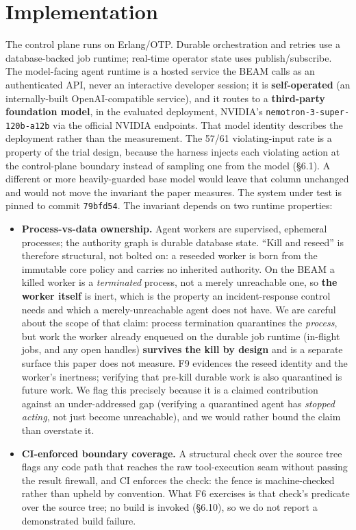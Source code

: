 \documentclass[11pt]{article}
\providecommand{\tightlist}{%
 \setlength{\itemsep}{0pt}\setlength{\parskip}{0pt}}
\begin{document}
\section{Implementation}\label{implementation}

The control plane runs on Erlang/OTP. Durable orchestration and retries use a
database-backed job runtime; real-time operator state uses publish/subscribe. The
model-facing agent runtime is a hosted service the BEAM calls as an authenticated API, never
an interactive developer session; it is \textbf{self-operated} (an internally-built OpenAI-compatible
service), and it routes to a \textbf{third-party foundation model}, in the evaluated deployment,
NVIDIA's \texttt{nemotron-3-super-120b-a12b} via the official NVIDIA endpoints. That model identity
describes the deployment rather than the measurement. The 57/61 violating-input rate is a property
of the trial design, because the harness injects each violating action at the control-plane boundary
instead of sampling one from the model (\S6.1). A different or more heavily-guarded base model would
leave that column unchanged and would not move the invariant the paper measures. The system
under test is pinned to commit \texttt{79bfd54}. The invariant depends on two runtime properties:

\begin{itemize}
\tightlist
\item
 \textbf{Process-vs-data ownership.} Agent workers are supervised, ephemeral processes; the
 authority graph is durable database state. ``Kill and reseed'' is therefore structural, not
 bolted on: a reseeded worker is born from the immutable core policy and carries no
 inherited authority. On the BEAM a killed worker is a \emph{terminated} process, not a merely
 unreachable one, so \textbf{the worker itself} is inert, which is the property an
 incident-response control needs and which a merely-unreachable agent does not have. We are
 careful about the scope of that claim: process termination quarantines the \emph{process}, but
 work the worker already enqueued on the durable job runtime (in-flight jobs, and any open
 handles) \textbf{survives the kill by design} and is a separate surface this paper does not
 measure. F9 evidences the reseed identity and the worker's inertness; verifying that
 pre-kill durable work is also quarantined is future work. We flag this precisely because it
 is a claimed contribution against an under-addressed gap (verifying a quarantined agent has
 \emph{stopped acting}, not just become unreachable), and we would rather bound the claim than
 overstate it.
\item
 \textbf{CI-enforced boundary coverage.} A structural check over the source tree flags any code
 path that reaches the raw tool-execution seam without passing the result firewall, and CI
 enforces the check: the fence is machine-checked rather than upheld by convention. What F6
 exercises is that check's predicate over the source tree; no build is invoked (\S6.10), so we do
 not report a demonstrated build failure.
\end{itemize}
\end{document}
